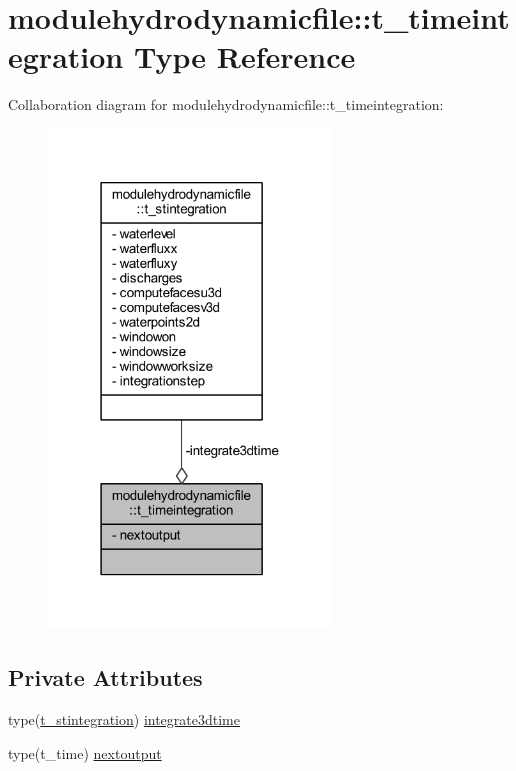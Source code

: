 \hypertarget{structmodulehydrodynamicfile_1_1t__timeintegration}{}\section{modulehydrodynamicfile\+:\+:t\+\_\+timeintegration Type Reference}
\label{structmodulehydrodynamicfile_1_1t__timeintegration}


Collaboration diagram for modulehydrodynamicfile\+:\+:t\+\_\+timeintegration\+:\nopagebreak
\begin{figure}[H]
\begin{center}
\leavevmode
\includegraphics[width=214pt]{structmodulehydrodynamicfile_1_1t__timeintegration__coll__graph}
\end{center}
\end{figure}
\subsection*{Private Attributes}
\begin{DoxyCompactItemize}
\item 
type(\mbox{\hyperlink{structmodulehydrodynamicfile_1_1t__stintegration}{t\+\_\+stintegration}}) \mbox{\hyperlink{structmodulehydrodynamicfile_1_1t__timeintegration_a5d44917bfa048adf91333feeb3a21fab}{integrate3dtime}}
\item 
type(t\+\_\+time) \mbox{\hyperlink{structmodulehydrodynamicfile_1_1t__timeintegration_ae7732705dce26d7375327d27d414bd94}{nextoutput}}
\end{DoxyCompactItemize}


